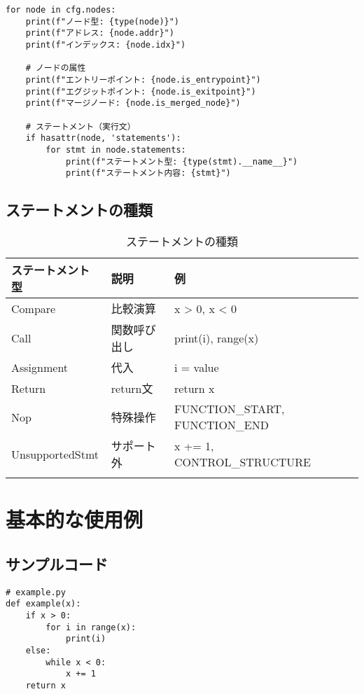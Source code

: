 \documentclass[12pt,a4paper]{article}
\begin{document}
\begin{lstlisting}
for node in cfg.nodes:
    print(f"ノード型: {type(node)}")
    print(f"アドレス: {node.addr}")
    print(f"インデックス: {node.idx}")

    # ノードの属性
    print(f"エントリーポイント: {node.is_entrypoint}")
    print(f"エグジットポイント: {node.is_exitpoint}")
    print(f"マージノード: {node.is_merged_node}")

    # ステートメント（実行文）
    if hasattr(node, 'statements'):
        for stmt in node.statements:
            print(f"ステートメント型: {type(stmt).__name__}")
            print(f"ステートメント内容: {stmt}")
\end{lstlisting}

\subsection{ステートメントの種類}

\begin{longtable}{|l|p{4cm}|p{4cm}|}
\hline
\textbf{ステートメント型} & \textbf{説明} & \textbf{例} \\
\hline
Compare & 比較演算 & x > 0, x < 0 \\
\hline
Call & 関数呼び出し & print(i), range(x) \\
\hline
Assignment & 代入 & i = value \\
\hline
Return & return文 & return x \\
\hline
Nop & 特殊操作 & FUNCTION\_START, FUNCTION\_END \\
\hline
UnsupportedStmt & サポート外 & x += 1, CONTROL\_STRUCTURE \\
\hline
\caption{ステートメントの種類}
\end{longtable}

\section{基本的な使用例}

\subsection{サンプルコード}

\begin{lstlisting}
# example.py
def example(x):
    if x > 0:
        for i in range(x):
            print(i)
    else:
        while x < 0:
            x += 1
    return x
\end{lstlisting}
\end{document}
